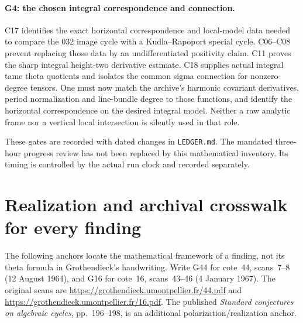 \documentclass[11pt]{article}
\theoremstyle{definition}\newtheorem{definition}[theorem]{Definition}\newtheorem{remark}[theorem]{Remark}
\begin{document}
\paragraph{G4: the chosen integral correspondence and connection.}
C17 identifies the exact horizontal correspondence and local-model
data needed to compare the 032 image cycle with a Kudla--Rapoport
special cycle. C06--C08 prevent replacing those data by an
undifferentiated positivity claim. C11 proves the sharp integral
height-two derivative estimate. C18 supplies actual integral tame
theta quotients and isolates the common sigma connection for
nonzero-degree tensors. One must now match the archive's harmonic
covariant derivatives, period normalization and line-bundle degree
to those functions, and identify the horizontal correspondence on
the desired integral model. Neither a raw analytic frame nor a
vertical local intersection is silently used in that role.

These gates are recorded with dated changes in \texttt{LEDGER.md}.
The mandated three-hour progress review has not been replaced by
this mathematical inventory. Its timing is controlled by the actual
run clock and recorded separately.


\appendix
\section{Realization and archival crosswalk for every finding}

The following anchors locate the mathematical framework of a
finding, not its theta formula in Grothendieck's handwriting.
Write G44 for cote~44, scans~7--8 (12 August 1964), and G16 for
cote~16, scans~43--46 (4 January 1967). The original scans are
\url{https://grothendieck.umontpellier.fr/44.pdf} and
\url{https://grothendieck.umontpellier.fr/16.pdf}.
The published \emph{Standard conjectures on algebraic cycles},
pp.~196--198, is an additional polarization/realization anchor.
\end{document}
